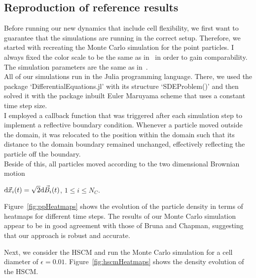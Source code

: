 \subsection{Reproduction of reference results}
Before running our new dynamics that include cell flexibility, we first want to guarantee that the simulations are running in the correct setup.
Therefore, we started with recreating the Monte Carlo simulation for the point particles. 
I always fixed the color scale to be the same as in~\cite{Bruna2012} in order to gain comparability. 
The simulation parameters are the same as in~\cite{Bruna2012}. \\
All of our simulations run in the Julia programming language. 
There, we used the package `DifferentialEquations.jl' with its structure `SDEProblem()' and then solved it with the package inbuilt Euler Maruyama scheme that uses a constant time step size. \\
I employed a callback function that was triggered after each simulation step to implement a reflective boundary condition. 
Whenever a particle moved outside the domain, it was relocated to the position within the domain such that its distance to the domain boundary remained unchanged, effectively reflecting the particle off the boundary. \\
Beside of this, all particles moved according to the two dimensional Brownian motion
\begin{center}
		$ \mathrm{d} \vec{x}_i(t) = \sqrt{2} \mathrm{d} \vec{B}_i(t)$, \hspace{0.5em} $1 \leq i \leq N_{C}$.
\end{center}
Figure~\ref{fig:ppHeatmaps} shows the evolution of the particle density in terms of heatmaps for different time steps. 
The results of our Monte Carlo simulation appear to be in good agreement with those of Bruna and Chapman, suggesting that our approach is robust and accurate.

Next, we consider the HSCM and run the Monte Carlo simulation for a cell diameter of $\epsilon = 0.01$. 
Figure~\ref{fig:hscmHeatmaps} shows the density evolution of the HSCM.


